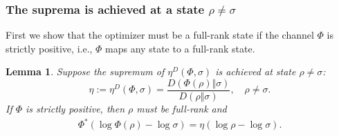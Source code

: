 \documentclass[11pt,reqno]{amsart}
\numberwithin{equation}{section}
\newtheorem{lemma}{Lemma}[section]
\begin{document}
\subsubsection{The suprema is achieved at a state $\rho \neq \sigma$} 
First we show that the optimizer must be a full-rank state if the channel $\Phi$ is strictly positive, i.e., $\Phi$ maps any state to a full-rank state.
\begin{lemma}\label{lemma:full-rank}
    Suppose the supremum of $\eta^D(\Phi,\sigma)$ is achieved at state $\rho \neq \sigma$:
    $$\eta:= \eta^D(\Phi,\sigma) = \frac{D(\Phi(\rho)\Vert\sigma)}
                {D(\rho\Vert\sigma)},\quad \rho \neq \sigma.$$
If $\Phi$ is strictly positive, then $\rho$ must be full-rank and
\begin{align}\label{eqn:optimizer equation}
    \Phi^*(\log \Phi(\rho) - \log \sigma) = \eta(\log \rho - \log \sigma).
\end{align}
\end{lemma}
\end{document}
